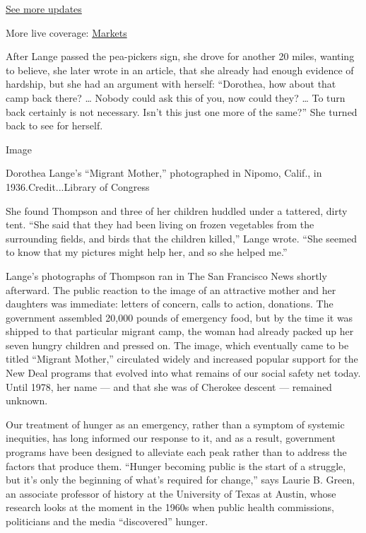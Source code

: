 \href{https://www.nytimes3xbfgragh.onion/2020/09/08/world/covid-19-coronavirus.html?action=click\&pgtype=Article\&state=default\&region=MAIN_CONTENT_1\&context=storylines_live_updates}{See
more updates}

More live coverage:
\href{https://www.nytimes3xbfgragh.onion/live/2020/09/08/business/stock-market-today-coronavirus?action=click\&pgtype=Article\&state=default\&region=MAIN_CONTENT_1\&context=storylines_live_updates}{Markets}

After Lange passed the pea-pickers sign, she drove for another 20 miles,
wanting to believe, she later wrote in an article, that she already had
enough evidence of hardship, but she had an argument with herself:
``Dorothea, how about that camp back there? \ldots{} Nobody could ask
this of you, now could they? \ldots{} To turn back certainly is not
necessary. Isn't this just one more of the same?'' She turned back to
see for herself.

Image

Dorothea Lange's ``Migrant Mother,'' photographed in Nipomo, Calif., in
1936.Credit...Library of Congress

She found Thompson and three of her children huddled under a tattered,
dirty tent. ``She said that they had been living on frozen vegetables
from the surrounding fields, and birds that the children killed,'' Lange
wrote. ``She seemed to know that my pictures might help her, and so she
helped me.''

Lange's photographs of Thompson ran in The San Francisco News shortly
afterward. The public reaction to the image of an attractive mother and
her daughters was immediate: letters of concern, calls to action,
donations. The government assembled 20,000 pounds of emergency food, but
by the time it was shipped to that particular migrant camp, the woman
had already packed up her seven hungry children and pressed on. The
image, which eventually came to be titled ``Migrant Mother,'' circulated
widely and increased popular support for the New Deal programs that
evolved into what remains of our social safety net today. Until 1978,
her name --- and that she was of Cherokee descent --- remained unknown.

Our treatment of hunger as an emergency, rather than a symptom of
systemic inequities, has long informed our response to it, and as a
result, government programs have been designed to alleviate each peak
rather than to address the factors that produce them. ``Hunger becoming
public is the start of a struggle, but it's only the beginning of what's
required for change,'' says Laurie B. Green, an associate professor of
history at the University of Texas at Austin, whose research looks at
the moment in the 1960s when public health commissions, politicians and
the media ``discovered'' hunger.

